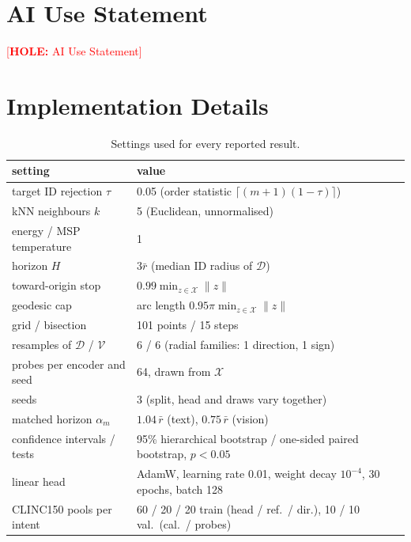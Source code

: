 \documentclass[twoside]{article}
\theoremstyle{definition}
\theoremstyle{remark}
\newcommand{\hole}[1]{\textcolor{red}{[\textbf{HOLE:} #1]}}
\begin{document}
\section*{AI Use Statement}
\hole{AI Use Statement}




\onecolumn
\appendix
\section{Implementation Details}\label{app:impl}
\begin{table}[!htbp]
\centering
\small
\caption{Settings used for every reported result.}
\label{tab:impl}
\begin{tabular}{ll}
\toprule
setting & value \\
\midrule
target ID rejection $\tau$ & 0.05 (order statistic $\lceil(m+1)(1-\tau)\rceil$) \\
kNN neighbours $k$ & 5 (Euclidean, unnormalised) \\
energy / MSP temperature & 1 \\
horizon $H$ & $3\bar r$ (median ID radius of $\mathcal{D}$) \\
toward-origin stop & $0.99\min_{z\in\mathcal{X}}\|z\|$ \\
geodesic cap & arc length $0.95\pi\min_{z\in\mathcal{X}}\|z\|$ \\
grid / bisection & 101 points / 15 steps \\
resamples of $\mathcal{D}$ / $\mathcal{V}$ & 6 / 6 (radial families: 1 direction, 1 sign) \\
probes per encoder and seed & 64, drawn from $\mathcal{X}$ \\
seeds & 3 (split, head and draws vary together) \\
matched horizon $\alpha_m$ & $1.04\,\bar r$ (text), $0.75\,\bar r$ (vision) \\
confidence intervals / tests & 95\% hierarchical bootstrap / one-sided paired bootstrap, $p<0.05$ \\
linear head & AdamW, learning rate 0.01, weight decay $10^{-4}$, 30 epochs, batch 128 \\
CLINC150 pools per intent & 60 / 20 / 20 train (head / ref.\ / dir.), 10 / 10 val.\ (cal.\ / probes) \\

\end{tabular}
\end{table}
\end{document}
